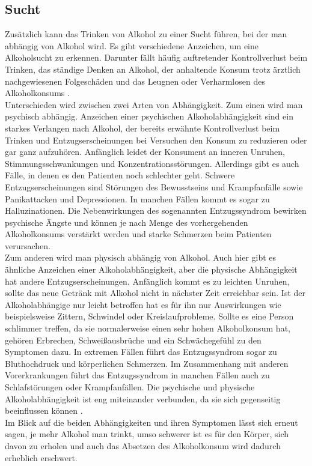 \documentclass[12pt]{article}
\begin{document}
\subsection{Sucht}                                                                                                                
Zusätzlich kann das Trinken von Alkohol zu einer Sucht führen, bei der man abhängig von Alkohol wird. Es gibt verschiedene Anzeichen, um eine Alkoholsucht zu erkennen. Darunter fällt häufig auftretender Kontrollverlust beim Trinken, das ständige Denken an Alkohol, der anhaltende Konsum trotz ärztlich nachgewiesenen Folgeschäden und das Leugnen oder Verharmlosen des Alkoholkonsums \autocite[3]{burger_bundes-gesundheitssurvey_2003}. \\
Unterschieden wird zwischen zwei Arten von Abhängigkeit. Zum einen wird man psychisch abhängig. Anzeichen einer psychischen Alkoholabhängigkeit sind ein starkes Verlangen nach Alkohol, der bereits erwähnte Kontrollverlust beim Trinken und Entzugserscheinungen bei Versuchen den Konsum zu reduzieren oder gar ganz aufzuhören. Anfänglich leidet der Konsument an inneren Unruhen, Stimmungsschwankungen und Konzentrationsstörungen. Allerdings gibt es auch Fälle, in denen es den Patienten noch schlechter geht. Schwere Entzugserscheinungen sind Störungen des Bewusstseins und Krampfanfälle sowie Panikattacken und Depressionen. In manchen Fällen kommt es sogar zu Halluzinationen. Die Nebenwirkungen des sogenannten Entzugssyndrom bewirken psychische Ängste und können je nach Menge des vorhergehenden Alkoholkonsums verstärkt werden und starke Schmerzen beim Patienten verursachen.\\
Zum anderen wird man physisch abhängig von Alkohol. Auch hier gibt es ähnliche Anzeichen einer Alkoholabhängigkeit, aber die physische Abhängigkeit hat andere Entzugserscheinungen. Anfänglich kommt es zu leichten Unruhen, sollte das neue Getränk mit Alkohol nicht in nächster Zeit erreichbar sein. Ist der Alkoholabhängige nur leicht betroffen hat es für ihn nur Auswirkungen wie beispielsweise Zittern, Schwindel oder Kreislaufprobleme. Sollte es eine Person schlimmer treffen, da sie normalerweise einen sehr hohen Alkoholkonsum hat, gehören Erbrechen, Schweißausbrüche und ein Schwächegefühl zu den Symptomen dazu. In extremen Fällen führt das Entzugssyndrom sogar zu Bluthochdruck und körperlichen Schmerzen. Im Zusammenhang mit anderen Vorerkrankungen führt das Entzugssyndrom in manchen Fällen auch zu Schlafstörungen oder Krampfanfällen. Die psychische und physische Alkoholabhängigkeit ist eng miteinander verbunden, da sie sich gegenseitig beeinflussen können \autocite{gohring_entzugserscheinungen_2022}. \\
Im Blick auf die beiden Abhängigkeiten und ihren Symptomen lässt sich erneut sagen, je mehr Alkohol man trinkt, umso schwerer ist es für den Körper, sich davon zu erholen und auch das Absetzen des Alkoholkonsum wird dadurch erheblich erschwert. \\
\end{document}
